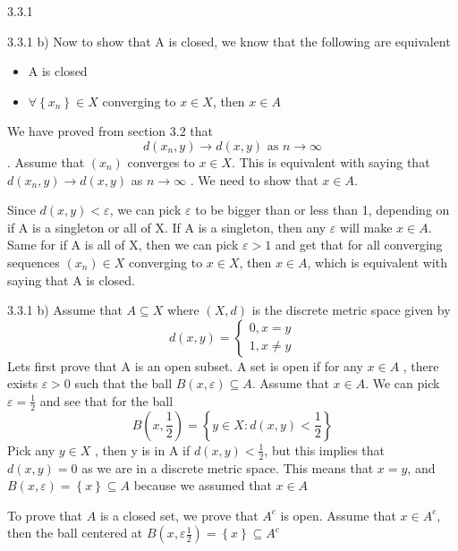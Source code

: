 \documentclass[a4paper,norsk]{article}
\renewcommand{\epsilon}{\varepsilon}
\begin{document}
\begin{oppgavebox}{3.3.1}{}
\begin{proofbox}{3.3.1 b)}{}
  Now to show that A is closed, we know that the following are equivalent
  \begin{itemize}
    \item A is closed
    \item $ \forall \left\{ x_n \right\} \in X $ converging to $ x \in X $, then $ x \in A $
  \end{itemize}
  We have proved from section 3.2 that 
  \[
      d(x_n, y) \rightarrow d(x,y) \text{ as } n \rightarrow \infty
  \]
  . Assume that $ \left( x_n \right)  $ converges to $ x \in X $. This is equivalent with saying that $ d(x_n, y ) \rightarrow d(x, y) $ as $ n \rightarrow \infty $ . We need to show that $ x \in A $. 

  Since $ d(x, y) < \epsilon   $, we can pick $ \epsilon  $ to be bigger than or less than 1, depending on if A is a singleton or all of X. If A is a singleton, then any $ \epsilon  $ will make $ x \in A $. Same for if A is all of X, then we can pick $ \epsilon > 1 $ and get that for all converging sequences $ \left( x_n \right) \in X $ converging to $ x \in X $, then $ x \in A $, which is equivalent with saying that A is closed.
\end{proofbox}
\begin{proofbox}{3.3.1 b)}{}
  Assume that $ A \subseteq X $ where $ \left( X, d \right)  $ is the discrete metric space given by 
  \[
      d(x, y) = \begin{cases}
      0, x=y\\
      1, x\neq y
      \end{cases}
  \]
  Lets first prove that A is an open subset. A set is open if for any $ x \in A $ , there exists $ \epsilon  > 0 $ such that the ball $ B \left( x, \epsilon  \right) \subseteq A $. Assume that $ x \in A $. We can pick $ \epsilon  = \frac{ 1 }{ 2 } $ and see that for the ball
  \[
      B \left( x, \frac{ 1 }{ 2 }  \right) = \left\{ y \in X : d(x, y) < \frac{ 1 }{ 2 }  \right\} 
  \]
  Pick any $ y \in X $ , then y is in A if $ d(x, y) < \frac{ 1 }{ 2 } $, but this implies that $ d(x, y) = 0 $ as we are in a discrete metric space. This means that $ x=y $, and $ B \left( x, \epsilon  \right) = \left\{ x \right\}  \subseteq A  $ because we assumed that $ x \in A $ 


  
  To prove that $ A $ is a closed set, we prove that $ A^c $ is open. Assume that $ x \in A^c $, then the ball centered at $ B \left( x, \epsilon  \frac{ 1 }{ 2 } \right) = \left\{ x \right\} \subseteq A^c $ 
  

\end{proofbox}
\end{oppgavebox}
\end{document}
